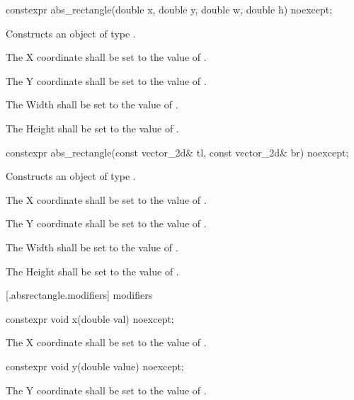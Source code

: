\begin{itemdecl}
constexpr abs_rectangle(double x, double y, double w, double h) noexcept;
\end{itemdecl}
\begin{itemdescr}
\pnum
\effects
Constructs an object of type .

\pnum
The X coordinate shall be set to the value of .

\pnum
The Y coordinate shall be set to the value of .

\pnum
The Width shall be set to the value of .

\pnum
The Height shall be set to the value of .
\end{itemdescr}

\begin{itemdecl}
constexpr abs_rectangle(const vector_2d& tl, const vector_2d& br) noexcept;
\end{itemdecl}
\begin{itemdescr}
\pnum
\effects
Constructs an object of type .

\pnum
The X coordinate shall be set to the value of .

\pnum
The Y coordinate shall be set to the value of .

\pnum
The Width shall be set to the value of .

\pnum
The Height shall be set to the value of .
\end{itemdescr}

 [\iotwod.absrectangle.modifiers]{ modifiers}

\begin{itemdecl}
constexpr void x(double val) noexcept;
\end{itemdecl}

\begin{itemdescr}
\pnum
\effects
The X coordinate shall be set to the value of .
\end{itemdescr}

\begin{itemdecl}
constexpr void y(double value) noexcept;
\end{itemdecl}
\begin{itemdescr}
\pnum
\effects
The Y coordinate shall be set to the value of .
\end{itemdescr}

